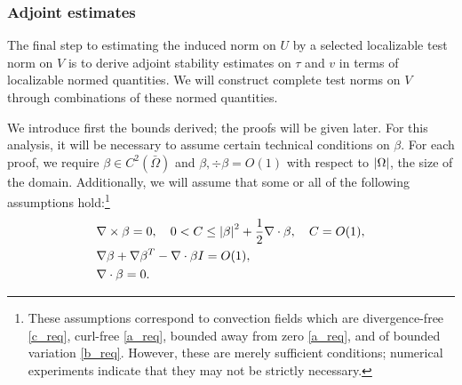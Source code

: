 
\subsubsection{Adjoint estimates}
\label{sec:strategy3}

The final step to estimating the induced norm on $U$ by a selected localizable test norm on $V$ is to derive adjoint stability estimates on $\tau$ and $v$ in terms of localizable normed quantities.  We will construct complete test norms on $V$ through combinations of these normed quantities.%

We introduce first the bounds derived; the proofs will be given later. For this analysis, it will be necessary to assume certain technical conditions on $\beta$.  For each proof, we require $\beta \in C^2(\bar{\Omega})$ and $\beta, \div \beta = O(1)$ with respect to $\LRb{\Omega}$, the size of the domain.  Additionally, we will assume that some or all of the following assumptions hold:\footnote{These assumptions correspond to convection fields which are divergence-free \eqref{c_req}, curl-free \eqref{a_req}, bounded away from zero \eqref{a_req}, and of bounded variation \eqref{b_req}.  However, these are merely sufficient conditions; numerical experiments indicate that they may not be strictly necessary.}
\begin{align}
&\curl \beta = 0, \quad 0<C \leq \left | \beta\right |^2 + \frac{1}{2}\div \beta, \quad C = O(1) \label{a_req},\\
&\grad \beta + \grad \beta ^T - \div \beta I = O(1) \label{b_req},\\
&\div \beta = 0 \label{c_req}.
\end{align}

